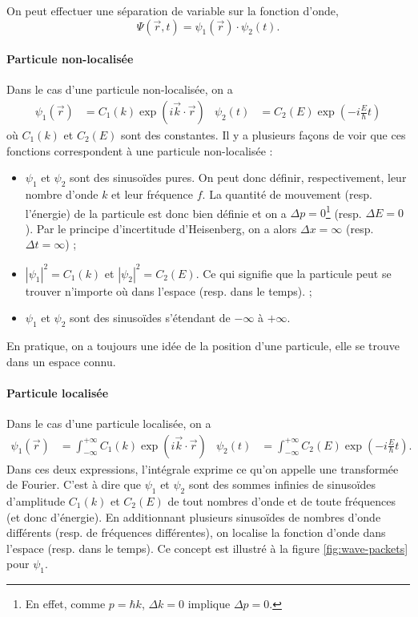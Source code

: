 On peut effectuer une séparation de variable sur la fonction d'onde,
\[ \Psi(\vec{r}, t) = \psi_1(\vec{r}) \cdot \psi_2(t). \]

\paragraph{Particule non-localisée}
Dans le cas d'une particule non-localisée, on a
\begin{align*}
\psi_1(\vec{r}) &= C_1(k)\exp(i\vec{k}\cdot\vec{r})
& \psi_2(t) &= C_2(E)\exp(-i\frac{E}{\hbar}t)
\end{align*}
où $C_1(k)$ et $C_2(E)$ sont des constantes.
Il y a plusieurs façons de voir que ces fonctions
correspondent à une particule non-localisée :
\begin{itemize}
	\item $\psi_1$ et $\psi_2$ sont des sinusoïdes
	pures. On peut donc définir, respectivement,
	leur nombre d'onde $k$ et leur fréquence $f$.
	La quantité de mouvement (resp. l'énergie) de
	la particule est donc bien définie
	et on a $\Delta p = 0$\footnote{En effet,
	comme $p = \hbar k$, $\Delta k = 0$ implique $\Delta p = 0$.}
	(resp. $\Delta E = 0$). Par le
	principe d'incertitude d'Heisenberg, on a alors
	$\Delta x = \infty$ (resp. $\Delta t = \infty$) ;
	\item $|\psi_1|^2 = C_1(k)$ et $|\psi_2|^2 = C_2(E)$. Ce
	qui signifie que la particule peut se trouver
	n'importe où dans l'espace (resp. dans le temps). ;
	\item $\psi_1$ et $\psi_2$ sont des sinusoïdes
	s'étendant de $-\infty$ à $+\infty$.
\end{itemize}
En pratique, on a toujours une idée de la
position d'une particule, elle se trouve dans
un espace connu.

\paragraph{Particule localisée}
Dans le cas d'une particule localisée, on a
\begin{align*}
\psi_1(\vec{r}) &= \int_{-\infty}^{+\infty} C_1(k)\exp(i\vec{k}\cdot\vec{r})
& \psi_2(t) &= \int_{-\infty}^{+\infty} C_2(E)\exp(-i\frac{E}{\hbar}t).
\end{align*}
Dans ces deux expressions, l'intégrale exprime ce qu'on
appelle une transformée de Fourier. C'est à dire que
$\psi_1$ et $\psi_2$ sont des sommes infinies de sinusoïdes
d'amplitude $C_1(k)$ et $C_2(E)$ de tout nombres d'onde et
de toute fréquences (et donc d'énergie).
En additionnant plusieurs sinusoïdes de nombres d'onde
différents (resp. de fréquences différentes),
on localise la fonction d'onde dans l'espace (resp.
dans le temps). Ce concept est illustré à la figure
\ref{fig:wave-packets} pour $\psi_1$.

